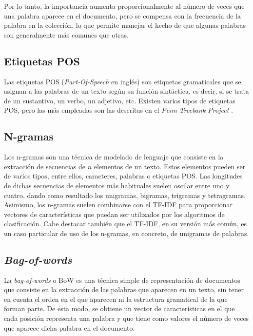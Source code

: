 \bigskip
Por lo tanto, la importancia aumenta proporcionalmente al número de veces que una palabra aparece en el documento, pero se compensa con la frecuencia
de la palabra en la colección, lo que permite manejar el hecho de que algunas palabras son generalmente más comunes que otras.

\subsection{Etiquetas POS}

Las etiquetas POS (\textit{Part-Of-Speech} en inglés) son etiquetas gramaticales que se asignan a las palabras de un texto según su función sintáctica, es
decir, si se trata de un sustantivo, un verbo, un adjetivo, etc.
Existen varios tipos de etiquetas POS, pero las más empleadas son las descritas en el \textit{Penn Treebank Project} \cite{marcus1993building}.

\subsection{N-gramas}

Los n-gramas son una técnica de modelado de lenguaje que consiste en la extracción de secuencias de $n$ elementos de un texto. Estos elementos pueden ser de varios
tipos, entre ellos, caracteres, palabras o etiquetas POS. Las longitudes de dichas secuencias de elementos más habituales suelen oscilar entre uno y cuatro, dando como resultado los unigramas, bigramas,
trigramas y tetragramas.
Asimismo, los n-gramas suelen combinarse con el TF-IDF para proporcionar vectores de características que puedan ser utilizados por los algoritmos de clasificación.
Cabe destacar también que el TF-IDF, en su versión más común, es un caso particular de uso de los n-gramas, en concreto, de unigramas de palabras.

\subsection{\textit{Bag-of-words}}
\label{sec:bag_of_words}

La \textit{bag-of-words} o BoW es una técnica simple de representación de documentos que consiste en la extracción de las palabras que aparecen en un texto,
sin tener en cuenta el orden en el que aparecen ni la estructura gramatical de la que forman parte. De esta modo, se obtiene un vector de características en el
que cada posición representa una palabra y que tiene como valores el número de veces que aparece dicha palabra en el documento.

